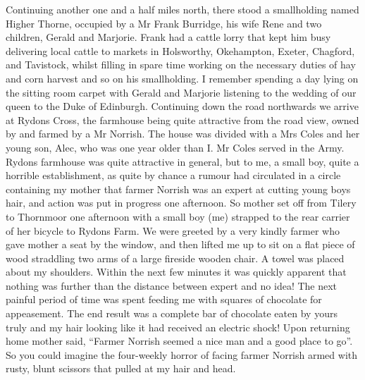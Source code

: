 Continuing another one and a half miles north, there stood a smallholding named
Higher Thorne, occupied by a Mr Frank Burridge, his wife Rene and two children,
Gerald and Marjorie. Frank had a cattle lorry that kept him busy delivering
local cattle to markets in Holsworthy, Okehampton, Exeter, Chagford, and
Tavistock, whilst filling in spare time working on the necessary duties of hay
and corn harvest and so on his smallholding. I remember spending a day lying on
the sitting room carpet with Gerald and Marjorie listening to the wedding of
our queen to the Duke of Edinburgh. Continuing down the road northwards we
arrive at Rydons Cross, the farmhouse being quite attractive from the road
view, owned by and farmed by a Mr Norrish. The house was divided with a Mrs
Coles and her young son, Alec, who was one year older than I. Mr Coles served
in the Army. Rydons farmhouse was quite attractive in general, but to me, a
small boy, quite a horrible establishment, as quite by chance a rumour had
circulated in a circle containing my mother that farmer Norrish was an expert
at cutting young boys hair, and action was put in progress one afternoon. So
mother set off from Tilery to Thornmoor one afternoon with a small boy
(me) strapped to the rear carrier of her bicycle to Rydons Farm. We were
greeted by a very kindly farmer who gave mother a seat by the window, and then
lifted me up to sit on a flat piece of wood straddling two arms of a large
fireside wooden chair. A towel was placed about my shoulders. Within the next
few minutes it was quickly apparent that nothing was further than the distance
between expert and no idea! The next painful period of time was spent feeding
me with squares of chocolate for appeasement. The end result was a complete bar
of chocolate eaten by yours truly and my hair looking like it had received an
electric shock!  Upon returning home mother said, ``Farmer Norrish seemed a
nice man and a good place to go''.  So you could imagine the four-weekly horror
of facing farmer Norrish armed with rusty, blunt scissors that pulled at my
hair and head.

